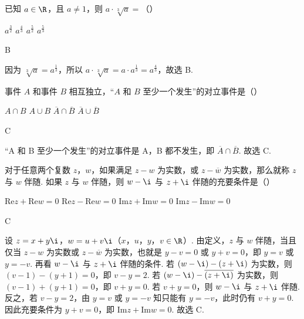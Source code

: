 \begin{problem}
已知 \( a\in\R \)，且 \( a\neq 1 \)，则 \( a\cdot \sqrt[3]{a}=\)（\quad）

\choices
    {\(a^{\frac{3}{2}}\)}
    {\(a^{\frac{4}{3}}\)}
    {\(a^{\frac{5}{2}}\)}
    {\(a^{\frac{5}{3}}\)}
\end{problem}

\begin{answer}
B
\end{answer}

\begin{solution}
因为 \( \sqrt[3]{a}=a^{\frac{1}{3}} \)，所以 \( a\cdot \sqrt[3]{a}=a\cdot a^{\frac{1}{3}}=a^{\frac{4}{3}} \)，故选 B.
\end{solution}

\begin{problem}
事件 \(A\) 和事件 \(B\) 相互独立，“\(A\) 和 \(B\) 至少一个发生”的对立事件是（\quad）

\choices
    {\( A\cap B \)}
    {\( A\cup B \)}
    {\( \overline{A}\cap \overline{B} \)}
    {\( \overline{A}\cup \overline{B} \)}
\end{problem}

\begin{answer}
C
\end{answer}

\begin{solution}
“A 和 B 至少一个发生”的对立事件是 A，B 都不发生，即 \( \overline{A}\cap \overline{B} \). 故选 C.
\end{solution}

\begin{problem}
对于任意两个复数 \( z \)，\( w \)，如果满足 \( z-w \) 为实数，或 \( z-\overline{w} \) 为实数，那么就称 \( z \) 与 \( w \) 伴随. 如果 \( z \) 与 \( w \) 伴随，则 \( w-\i \) 与 \( z+\i \) 伴随的充要条件是（\quad）

\choices
    {\( \mathrm{Re} z+\mathrm{Re} w=0 \)}
    {\( \mathrm{Re} z-\mathrm{Re} w=0 \)}
    {\( \mathrm{Im} z+\mathrm{Im} w=0 \)}
    {\( \mathrm{Im} z-\mathrm{Im} w=0 \)}
\end{problem}

\begin{answer}
C
\end{answer}

\begin{solution}
设 \( z=x+y\i \)，\( w=u+v\i \)（\(x\)，\(u\)，\(y\)，\(v\in\R\)）.
由定义，\( z \) 与 \( w \) 伴随，当且仅当 \( z-w \) 为实数或 \( z-\overline{w} \) 为实数，也就是 \( y-v=0 \) 或 \( y+v=0 \)，即 \( y=v \) 或 \( y=-v \).
再看 \( w-\i \) 与 \( z+\i \) 伴随的条件. 若 \( \left( w-\i \right)-\left( z+\i \right) \) 为实数，则 \( \left( v-1 \right)-\left( y+1 \right)=0 \)，即 \( v-y=2 \). 若 \( \left( w-\i \right)-\overline{\left( z+\i \right)} \) 为实数，则 \( \left( v-1 \right)+\left( y+1 \right)=0 \)，即 \( v+y=0 \).
若 \( v+y=0 \)，则 \( w-\i \) 与 \( z+\i \) 伴随. 反之，若 \( v-y=2 \)，由 \( y=v \) 或 \( y=-v \) 知只能有 \( y=-v \)，此时仍有 \( v+y=0 \). 因此充要条件为 \( y+v=0 \)，即 \( \mathrm{Im} z+\mathrm{Im} w=0 \). 故选 C.
\end{solution}

